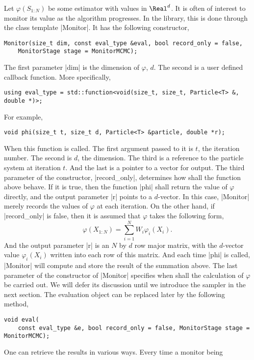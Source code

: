 Let $\varphi(S_{1:N})$ be some estimator with values in $\Real^d$. It is often
of interest to monitor its value as the algorithm progresses. In the library,
this is done through the class template |Monitor|. It has the following
constructor,
\begin{verbatim}
Monitor(size_t dim, const eval_type &eval, bool record_only = false,
    MonitorStage stage = MonitorMCMC);
\end{verbatim}
The first parameter |dim| is the dimension of $\varphi$, $d$. The second is a
user defined callback function. More specifically,
\begin{verbatim}
using eval_type = std::function<void(size_t, size_t, Particle<T> &, double *)>;
\end{verbatim}
For example,
\begin{verbatim}
void phi(size_t t, size_t d, Particle<T> &particle, double *r);
\end{verbatim}
When this function is called. The first argument passed to it is $t$, the
iteration number. The second is $d$, the dimension. The third is a reference to
the particle system at iteration $t$. And the last is a pointer to a vector for
output. The third parameter of the constructor, |record_only|, determines how
shall the function above behave. If it is true, then the function |phi| shall
return the value of $\varphi$ directly, and the output parameter |r| points to
a $d$-vector. In this case, |Monitor| merely records the values of $\varphi$ at
each iteration. On the other hand, if |record_only| is false, then it is
assumed that $\varphi$ takes the following form,
\begin{equation*}
  \varphi(X_{1:N}) = \sum_{i=1}^N W_i \varphi_i(X_i).
\end{equation*}
And the output parameter |r| is an $N$ by $d$ row major matrix, with the
$d$-vector value $\varphi_i(X_i)$ written into each row of this matrix. And
each time |phi| is called, |Monitor| will compute and store the result of the
summation above. The last parameter of the constructor of |Monitor| specifies
when shall the calculation of $\varphi$ be carried out. We will defer its
discussion until we introduce the sampler in the next section. The evaluation
object can be replaced later by the following method,
\begin{verbatim}
void eval(
    const eval_type &e, bool record_only = false, MonitorStage stage = MonitorMCMC);
\end{verbatim}
One can retrieve the results in various ways. Every time a monitor being
